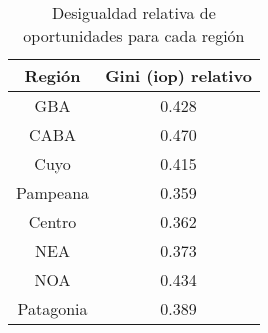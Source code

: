 \begin{table}
    \centering
    \caption{Desigualdad relativa de oportunidades para cada región}
    \begin{tabular}{cc}
    \hline
        \textbf{Región} & \textbf{Gini (iop) relativo} \\
    \hline
        GBA & 0.428 \\
        CABA & 0.470 \\
        Cuyo & 0.415 \\
        Pampeana & 0.359 \\
        Centro & 0.362 \\
        NEA & 0.373 \\
        NOA & 0.434 \\
        Patagonia & 0.389 \\
    \hline
    \end{tabular}
    \label{tab:iop-region-relativa}
\end{table}
